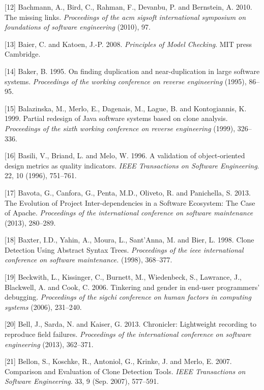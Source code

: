 \documentclass[12pt]{report}
\begin{document}
\hypertarget{ref-Bachmann2010}{}
{[}12{]} Bachmann, A., Bird, C., Rahman, F., Devanbu, P. and Bernstein,
A. 2010. The missing links. \emph{Proceedings of the acm sigsoft
international symposium on foundations of software engineering} (2010),
97.

\hypertarget{ref-Baier2008}{}
{[}13{]} Baier, C. and Katoen, J.-P. 2008. \emph{Principles of Model
Checking}. MIT press Cambridge.

\hypertarget{ref-Baker}{}
{[}14{]} Baker, B. 1995. On finding duplication and near-duplication in
large software systems. \emph{Proceedings of the working conference on
reverse engineering} (1995), 86--95.

\hypertarget{ref-Balazinska}{}
{[}15{]} Balazinska, M., Merlo, E., Dagenais, M., Lague, B. and
Kontogiannis, K. 1999. Partial redesign of Java software systems based
on clone analysis. \emph{Proceedings of the sixth working conference on
reverse engineering} (1999), 326--336.

\hypertarget{ref-Basili1996}{}
{[}16{]} Basili, V., Briand, L. and Melo, W. 1996. A validation of
object-oriented design metrics as quality indicators. \emph{IEEE
Transactions on Software Engineering}. 22, 10 (1996), 751--761.

\hypertarget{ref-Bavota2013}{}
{[}17{]} Bavota, G., Canfora, G., Penta, M.D., Oliveto, R. and
Panichella, S. 2013. The Evolution of Project Inter-dependencies in a
Software Ecosystem: The Case of Apache. \emph{Proceedings of the
international conference on software maintenance} (2013), 280--289.

\hypertarget{ref-Baxter1998}{}
{[}18{]} Baxter, I.D., Yahin, A., Moura, L., Sant'Anna, M. and Bier, L.
1998. Clone Detection Using Abstract Syntax Trees. \emph{Proceedings of
the ieee international conference on software maintenance.} (1998),
368--377.

\hypertarget{ref-Beckwith2006}{}
{[}19{]} Beckwith, L., Kissinger, C., Burnett, M., Wiedenbeck, S.,
Lawrance, J., Blackwell, A. and Cook, C. 2006. Tinkering and gender in
end-user programmers' debugging. \emph{Proceedings of the sigchi
conference on human factors in computing systems} (2006), 231--240.

\hypertarget{ref-Bell2013}{}
{[}20{]} Bell, J., Sarda, N. and Kaiser, G. 2013. Chronicler:
Lightweight recording to reproduce field failures. \emph{Proceedings of
the international conference on software engineering} (2013), 362--371.

\hypertarget{ref-Bellon2007}{}
{[}21{]} Bellon, S., Koschke, R., Antoniol, G., Krinke, J. and Merlo, E.
2007. Comparison and Evaluation of Clone Detection Tools. \emph{IEEE
Transactions on Software Engineering}. 33, 9 (Sep. 2007), 577--591.
\end{document}
